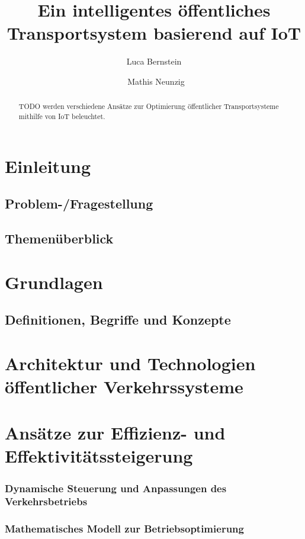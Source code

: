 \documentclass[ngerman]{seminarbeitrag} %
\begin{document}
\title{Ein intelligentes öffentliches Transportsystem basierend auf IoT}
\author{Luca Bernstein\and\ Mathis Neunzig}

\maketitle %

\begin{abstract}
TODO werden verschiedene Ansätze zur Optimierung öffentlicher Transportsysteme mithilfe von IoT beleuchtet.

\end{abstract}

\section{Einleitung}
\subsection{Problem-/Fragestellung}
\subsection{Themenüberblick}
\section{Grundlagen}
\subsection{Definitionen, Begriffe und Konzepte}
\section{Architektur und Technologien öffentlicher Verkehrssysteme}
\section{Ansätze zur Effizienz- und Effektivitätssteigerung}
\subsubsection{Dynamische Steuerung und Anpassungen des Verkehrsbetriebs}
\subsubsection{Mathematisches Modell zur Betriebsoptimierung}
\end{document}
